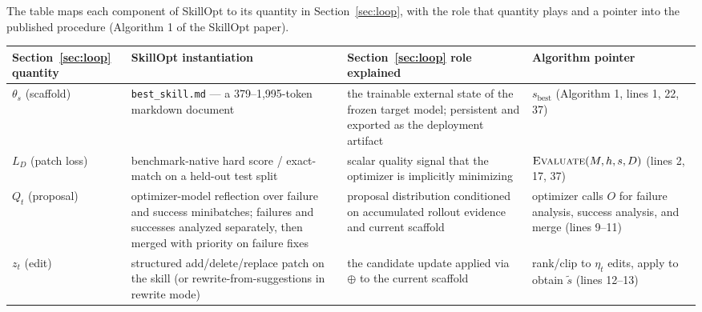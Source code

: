 \documentclass[
  11pt,
]{article}
\newcounter{none} %
\begin{document}
The table maps each component of SkillOpt to its quantity in Section~\ref{sec:loop}, with the role that quantity plays and a pointer into the published procedure (Algorithm 1 of the SkillOpt paper).

{\def\LTcaptype{none} %
\begin{longtable}[]{@{}
  >{\raggedright\arraybackslash}p{}
  >{\raggedright\arraybackslash}p{}
  >{\raggedright\arraybackslash}p{}
  >{\raggedright\arraybackslash}p{}@{}}
\toprule\noalign{}
\begin{minipage}[b]{\linewidth}\raggedright
Section~\ref{sec:loop} quantity
\end{minipage} & \begin{minipage}[b]{\linewidth}\raggedright
SkillOpt instantiation
\end{minipage} & \begin{minipage}[b]{\linewidth}\raggedright
Section~\ref{sec:loop} role explained
\end{minipage} & \begin{minipage}[b]{\linewidth}\raggedright
Algorithm pointer
\end{minipage} \\
\midrule\noalign{}
\endhead
\bottomrule\noalign{}
\endlastfoot
\(\theta_s\) (scaffold) & \texttt{best\_skill.md} --- a 379--1,995-token markdown document & the trainable external state of the frozen target model; persistent and exported as the deployment artifact & \(s_{\text{best}}\) (Algorithm 1, lines 1, 22, 37) \\
\(L_D\) (patch loss) & benchmark-native hard score / exact-match on a held-out test split & scalar quality signal that the optimizer is implicitly minimizing & \(\textsc{Evaluate}(M, h, s, D)\) (lines 2, 17, 37) \\
\(Q_t\) (proposal) & optimizer-model reflection over failure and success minibatches; failures and successes analyzed separately, then merged with priority on failure fixes & proposal distribution conditioned on accumulated rollout evidence and current scaffold & optimizer calls \(O\) for failure analysis, success analysis, and merge (lines 9--11) \\
\(z_t\) (edit) & structured add/delete/replace patch on the skill (or rewrite-from-suggestions in rewrite mode) & the candidate update applied via \(\oplus\) to the current scaffold & rank/clip to \(\eta_t\) edits, apply to obtain \(\tilde s\) (lines 12--13) \\

\end{longtable}}
\end{document}
